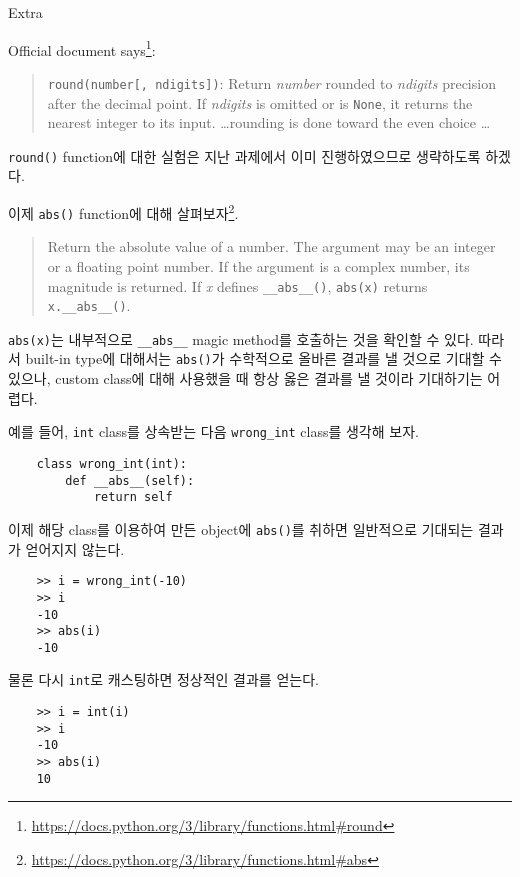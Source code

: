 \documentclass[a4paper,11pt]{scrartcl}
\begin{document}
\begin{labeling}{Extra}
  \item[Extra]
  Official document says\footnote{\url{https://docs.python.org/3/library/functions.html\#round}}:

  \begin{quotation}
    \lstinline{round(number[, ndigits])}: Return \emph{number} rounded to \emph{ndigits} precision after the decimal point. If \emph{ndigits} is omitted or is \lstinline{None}, it returns the nearest integer to its input. \dots rounding is done toward the even choice \dots
  \end{quotation}

  \lstinline{round()} function에 대한 실험은 지난 과제에서 이미 진행하였으므로 생략하도록 하겠다.

  이제 \lstinline{abs()} function에 대해 살펴보자\footnote{\url{https://docs.python.org/3/library/functions.html\#abs}}.

  \begin{quotation}
    Return the absolute value of a number. The argument may be an integer or a floating point number. If the argument is a complex number, its magnitude is returned. If \emph{x} defines \lstinline{__abs__()}, \lstinline{abs(x)} returns \lstinline{x.__abs__()}.
  \end{quotation}

  \lstinline{abs(x)}는 내부적으로 \lstinline{__abs__} magic method를 호출하는 것을 확인할 수 있다. 따라서 built-in type에 대해서는 \lstinline{abs()}가 수학적으로 올바른 결과를 낼 것으로 기대할 수 있으나, custom class에 대해 사용했을 때 항상 옳은 결과를 낼 것이라 기대하기는 어렵다.

  예를 들어, \lstinline{int} class를 상속받는 다음 \lstinline{wrong_int} class를 생각해 보자.

  \begin{lstlisting}
    class wrong_int(int):
        def __abs__(self):
            return self
  \end{lstlisting}

  이제 해당 class를 이용하여 만든 object에 \lstinline{abs()}를 취하면 일반적으로 기대되는 결과가 얻어지지 않는다.

  \begin{lstlisting}
    >> i = wrong_int(-10)
    >> i
    -10
    >> abs(i)
    -10
  \end{lstlisting}

  물론 다시 \lstinline{int}로 캐스팅하면 정상적인 결과를 얻는다.

  \begin{lstlisting}
    >> i = int(i)
    >> i
    -10
    >> abs(i)
    10
  \end{lstlisting}


\end{labeling}
\end{document}
